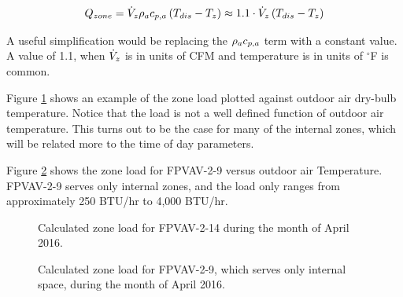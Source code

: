 \begin{equation}
    Q_{zone}=\dot{V}_{z} \rho_a c_{p,a}{} \left(T_{dis}-T_{z} \right) \approx 1.1 \cdot \dot{V}_{z}\left(T_{dis}-T_{z} \right)
\end{equation}

A useful simplification would be replacing the \(\rho_a c_{p,a}{}\) term with a constant value. A value of 1.1, when \(\dot{V}_{z}\) is in units of CFM and temperature is in units of \(^\circ\)F is common. 

Figure \ref{fig:ZoneLoadforContainerFPVAV214vsOADryBulbTemperatureNOAA} shows an example of the zone load plotted against outdoor air dry-bulb temperature. Notice that the load is not a well defined function of outdoor air temperature. This turns out to be the case for many of the internal zones, which will be related more to the time of day parameters. 

Figure \ref{fig:ZoneLoadForContainer29vsNOAAOAT} shows the zone load for FPVAV-2-9 versus outdoor air Temperature. FPVAV-2-9 serves only internal zones, and the load only ranges from approximately 250 BTU/hr to 4,000 BTU/hr. 




\begin{figure}
\centering
{}
\caption{Calculated zone load for FPVAV-2-14 during the month of April 2016.}
\label{fig:ZoneLoadforContainerFPVAV214vsOADryBulbTemperatureNOAA}
\end{figure}


\begin{figure}
\centering
{}
\caption{Calculated zone load for FPVAV-2-9, which serves only internal space, during the month of April 2016.}
\label{fig:ZoneLoadForContainer29vsNOAAOAT}
\end{figure}


